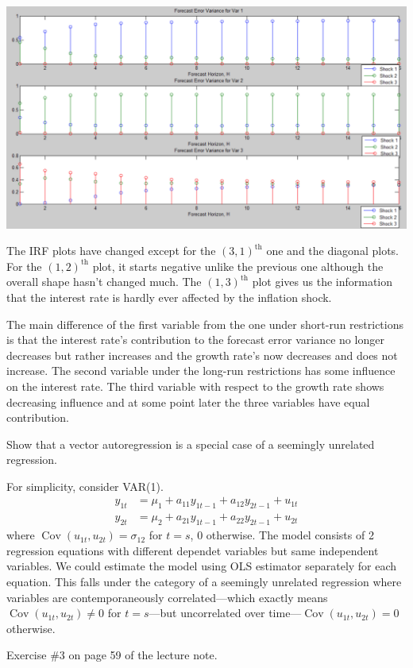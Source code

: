 \documentclass[answers]{exam}
\begin{document}
\begin{questions}
\begin{solution}
\begin{enumerate}[(a)]
\begin{center}
            \includegraphics[scale=0.25]{vardecomp_long.png}
            \end{center}
            \par
            The IRF plots have changed except for the $(3,1)^{\text{th}}$ one and the diagonal plots. For the $(1,2)^{\text{th}}$ plot, it starts negative unlike the previous one although the overall shape hasn't changed much. The $(1,3)^{\text{th}}$ plot gives us the information that the interest rate is hardly ever affected by the inflation shock.
            \par
            The main difference of the first variable from the one under short-run restrictions is that the interest rate's contribution to the forecast error variance no longer decreases but rather increases and the growth rate's now decreases and does not increase. The second variable under the long-run restrictions has some influence on the interest rate. The third variable with respect to the growth rate shows decreasing influence and at some point later the three variables have equal contribution.
        \end{enumerate}
    \end{solution}
    \question
    Show that a vector autoregression is a special case of a seemingly unrelated regression.
    \begin{solution}
        For simplicity, consider VAR(1).
        \begin{align}
            y_{1t} &= \mu_{1}+a_{11}y_{1t-1}+a_{12}y_{2t-1}+u_{1t}\\
            y_{2t} &= \mu_{2}+a_{21}y_{1t-1}+a_{22}y_{2t-1}+u_{2t}
        \end{align}
        where $\operatorname{Cov}(u_{1t},u_{2t})=\sigma_{12}$ for $t=s$, $0$ otherwise. The model consists of 2 regression equations with different dependet variables but same independent variables. We could estimate the model using OLS estimator separately for each equation. This falls under the category of a seemingly unrelated regression where variables are contemporaneously correlated---which exactly means $\operatorname{Cov}(u_{1t},u_{2t})\neq 0$ for $t=s$---but uncorrelated over time---$\operatorname{Cov}(u_{1t},u_{2t})= 0$ otherwise. 
    \end{solution}
    \question
    Exercise \#3 on page 59 of the lecture note.
    \begin{solution}

    \end{solution}
\end{questions}
\end{document}
